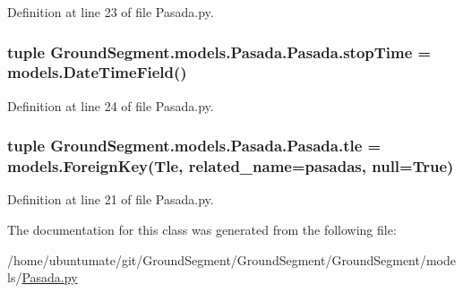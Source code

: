 Definition at line 23 of file Pasada.\+py.

\hypertarget{class_ground_segment_1_1models_1_1_pasada_1_1_pasada_aa26eb2642841aeccd68e417cd3eb4dba}{}
\subsubsection[{stop\+Time}]{\setlength{\rightskip}{0pt plus 5cm}tuple Ground\+Segment.\+models.\+Pasada.\+Pasada.\+stop\+Time = models.\+Date\+Time\+Field()\hspace{0.3cm}{\ttfamily [static]}}\label{class_ground_segment_1_1models_1_1_pasada_1_1_pasada_aa26eb2642841aeccd68e417cd3eb4dba}


Definition at line 24 of file Pasada.\+py.

\hypertarget{class_ground_segment_1_1models_1_1_pasada_1_1_pasada_ab930e8f3c872ed571982b5f4b81ddca2}{}
\subsubsection[{tle}]{\setlength{\rightskip}{0pt plus 5cm}tuple Ground\+Segment.\+models.\+Pasada.\+Pasada.\+tle = models.\+Foreign\+Key({\bf Tle}, related\+\_\+name=\textquotesingle{}pasadas\textquotesingle{}, null=True)\hspace{0.3cm}{\ttfamily [static]}}\label{class_ground_segment_1_1models_1_1_pasada_1_1_pasada_ab930e8f3c872ed571982b5f4b81ddca2}


Definition at line 21 of file Pasada.\+py.



The documentation for this class was generated from the following file\+:\begin{DoxyCompactItemize}
\item 
/home/ubuntumate/git/\+Ground\+Segment/\+Ground\+Segment/\+Ground\+Segment/models/\hyperlink{_pasada_8py}{Pasada.\+py}\end{DoxyCompactItemize}
